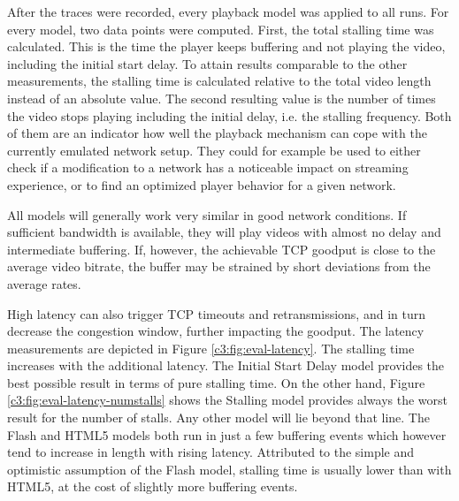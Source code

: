 After the traces were recorded, every playback model was applied to all runs. For every model, two data points were computed. First, the total stalling time was calculated. This is the time the player keeps buffering and not playing the video, including the initial start delay. To attain results comparable to the other measurements, the stalling time is calculated relative to the total video length instead of an absolute value. The second resulting value is the number of times the video stops playing including the initial delay, i.e. the stalling frequency. Both of them are an indicator how well the playback mechanism can cope with the currently emulated network setup. They could for example be used to either check if a modification to a network has a noticeable impact on streaming experience, or to find an optimized player behavior for a given network.

All models will generally work very similar in good network conditions. If sufficient bandwidth is available, they will play videos with almost no delay and  intermediate buffering. If, however, the achievable TCP goodput is close to the average video bitrate, the buffer may be strained by short deviations from the average rates. %

High latency can also trigger TCP timeouts and retransmissions, and in turn decrease the congestion window, further impacting the goodput. The latency measurements are depicted in Figure \ref{c3:fig:eval-latency}. The stalling time increases with the additional latency. The Initial Start Delay model provides the best possible result in terms of pure stalling time. On the other hand, Figure \ref{c3:fig:eval-latency-numstalls} shows the Stalling model provides always the worst result for the number of stalls. Any other model will lie beyond that line. The Flash and HTML5 models both run in just a few buffering events which however tend to increase in length with rising latency. Attributed to the simple and optimistic assumption of the Flash model, stalling time is usually lower than with HTML5, at the cost of slightly more buffering events.
 

